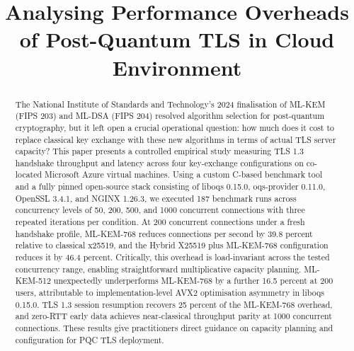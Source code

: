 \documentclass[conference]{IEEEtran}
\begin{document}
\title{Analysing Performance Overheads of Post-Quantum TLS in Cloud Environment}

\author{
\and
{}
}

\maketitle

\begin{abstract}
The National Institute of Standards and Technology's 2024 finalisation of ML-KEM (FIPS 203) and ML-DSA (FIPS 204) resolved algorithm selection for post-quantum cryptography, but it left open a crucial operational question: how much does it cost to replace classical key exchange with these new algorithms in terms of actual TLS server capacity? This paper presents a controlled empirical study
measuring TLS 1.3 handshake throughput and latency across four key-exchange
configurations on co-located Microsoft Azure virtual machines. Using a custom
C-based benchmark tool and a fully pinned open-source stack consisting of liboqs
0.15.0, oqs-provider 0.11.0, OpenSSL 3.4.1, and NGINX 1.26.3, we executed 187
benchmark runs across concurrency levels of 50, 200, 500, and 1000 concurrent
connections with three repeated iterations per condition. At 200 concurrent
connections under a fresh handshake profile, ML-KEM-768 reduces connections per
second by 39.8 percent relative to classical x25519, and the Hybrid X25519 plus
ML-KEM-768 configuration reduces it by 46.4 percent. Critically, this overhead is
load-invariant across the tested concurrency range, enabling straightforward
multiplicative capacity planning. ML-KEM-512 unexpectedly underperforms ML-KEM-768
by a further 16.5 percent at 200 users, attributable to implementation-level AVX2
optimisation asymmetry in liboqs 0.15.0. TLS 1.3 session resumption recovers 25
percent of the ML-KEM-768 overhead, and zero-RTT early data achieves near-classical
throughput parity at 1000 concurrent connections. These results give practitioners direct guidance on capacity planning and configuration for PQC TLS deployment.
\end{abstract}
\end{document}
